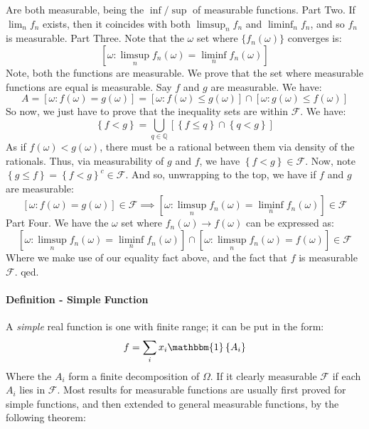 \documentclass[12pt,a4paper]{article}
\newcommand{\1}[1]{\mathbbm{1}\left\{ #1 \right\}}
\newcommand{\Q}{\mathbb{Q}}
\newcommand{\fcal}{\mathcal{F}}
\begin{document}
Are both measurable, being the $\inf/\sup$ of measurable functions. Part Two. If $\lim_n f_n$ exists, then it coincides with both $\limsup_n f_n$ and $\liminf_n f_n$, and so $f_n$ is measurable. Part Three. Note that the $\omega$ set where $\{f_n(\omega)\}$ converges is:
$$
	\left[\omega : \limsup_n f_n(\omega) = \liminf_n f_n(\omega)\right]
$$
Note, both the functions are measurable. We prove that the set where measurable functions are equal is measurable. Say $f$ and $g$ are measurable. We have:
$$
	A = \left[\omega : f(\omega) = g(\omega)\right] = 
	\left[\omega : f(\omega) \leq g(\omega)\right] \cap
	\left[\omega : g(\omega) \leq f(\omega)\right]
$$
So now, we just have to prove that the inequality sets are within $\fcal$. We have:
$$
	\left\{f < g\right\} = \bigcup_{q \in \Q} \left[\left\{f \leq q\right\} \cap \left\{q < g\right\}\right]
$$
As if $f(\omega) < g(\omega)$, there must be a rational between them via density of the rationals. Thus, via measurability of $g$ and $f$, we have $\left\{f < g\right\} \in \fcal$. Now, note $\left\{g \leq f\right\} = \left\{f < g\right\}^c \in \fcal$. And so, unwrapping to the top, we have if $f$ and $g$ are measurable:
$$
	\left[\omega : f(\omega) = g(\omega)\right] \in \fcal \implies \left[\omega : \limsup_n f_n(\omega) = \liminf_n f_n(\omega)\right] \in \fcal
$$
Part Four. We have the $\omega$ set where $f_n(\omega) \to f(\omega)$ can be expressed as:
$$
	\left[\omega : \limsup_n f_n(\omega) = \liminf_n f_n(\omega)\right] \cap
	\left[\omega : \limsup_n f_n(\omega) = f(\omega)\right] \in \fcal
$$
Where we make use of our equality fact above, and the fact that $f$ is measurable $\fcal$. qed.

\paragraph{Definition - Simple Function} A \textit{simple} real function is one with finite range; it can be put in the form:
$$
	f = \sum_i x_i \1{A_i}
$$
Where the $A_i$ form a finite decomposition of $\Omega$. If it clearly measurable $\fcal$ if each $A_i$ lies in $\fcal$. Most results for measurable functions are usually first proved for simple functions, and then extended to general measurable functions, by the following theorem:
\end{document}
